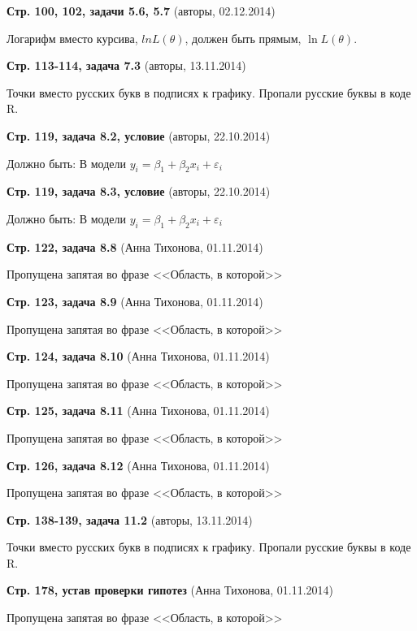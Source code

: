 \documentclass{article}
\newcommand{\erroronpage}[4]{\textbf{Стр. #1, #2} (#3, #4)}
\begin{document}
\erroronpage{100, 102}{задачи 5.6, 5.7}{авторы}{02.12.2014}

Логарифм вместо курсива, $ln L(\theta)$, должен быть прямым, $\ln L(\theta)$.


\erroronpage{113-114}{задача 7.3}{авторы}{13.11.2014}

Точки вместо русских букв в подписях к графику. Пропали русские буквы в коде R.

\erroronpage{119}{задача 8.2, условие}{авторы}{22.10.2014}

Должно быть: В модели $y_i=\beta_1 + \beta_2 x_i +\varepsilon_i$

\erroronpage{119}{задача 8.3, условие}{авторы}{22.10.2014}

Должно быть: В модели $y_i=\beta_1 + \beta_2 x_i +\varepsilon_i$

\erroronpage{122}{задача 8.8}{Анна Тихонова}{01.11.2014}

Пропущена запятая во фразе <<Область, в которой>>

\erroronpage{123}{задача 8.9}{Анна Тихонова}{01.11.2014}

Пропущена запятая во фразе <<Область, в которой>>

\erroronpage{124}{задача 8.10}{Анна Тихонова}{01.11.2014}

Пропущена запятая во фразе <<Область, в которой>>

\erroronpage{125}{задача 8.11}{Анна Тихонова}{01.11.2014}

Пропущена запятая во фразе <<Область, в которой>>

\erroronpage{126}{задача 8.12}{Анна Тихонова}{01.11.2014}

Пропущена запятая во фразе <<Область, в которой>>

\erroronpage{138-139}{задача 11.2}{авторы}{13.11.2014}

Точки вместо русских букв в подписях к графику. Пропали русские буквы в коде R.

\erroronpage{178}{устав проверки гипотез}{Анна Тихонова}{01.11.2014}

Пропущена запятая во фразе <<Область, в которой>>
\end{document}
